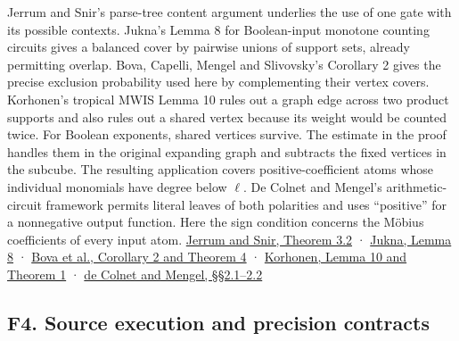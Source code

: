 \documentclass[11pt,a4paper]{article}
\begin{document}
Jerrum and Snir's parse-tree content argument underlies the use of one
gate with its possible contexts. Jukna's Lemma 8 for Boolean-input
monotone counting circuits gives a balanced cover by pairwise unions of
support sets, already permitting overlap. Bova, Capelli, Mengel and
Slivovsky's Corollary 2 gives the precise exclusion probability used
here by complementing their vertex covers. Korhonen's tropical MWIS
Lemma 10 rules out a graph edge across two product supports and also
rules out a shared vertex because its weight would be counted twice. For
Boolean exponents, shared vertices survive. The estimate in the proof
handles them in the original expanding graph and subtracts the fixed
vertices in the subcube. The resulting application covers
positive-coefficient atoms whose individual monomials have degree below
\(\ell\). De Colnet and Mengel's arithmetic-circuit framework permits
literal leaves of both polarities and uses ``positive'' for a
nonnegative output function. Here the sign condition concerns the Möbius
coefficients of every input atom.
\href{https://snir.cs.illinois.edu/listed/J7.pdf}{Jerrum and Snir,
Theorem 3.2} ·
\href{https://web.vu.lt/mif/s.jukna/ftp/counting-web.pdf}{Jukna, Lemma
8} · \href{https://arxiv.org/pdf/1411.1995}{Bova et al., Corollary 2 and
Theorem 4} ·
\href{https://doi.org/10.4230/LIPIcs.ICALP.2021.87}{Korhonen, Lemma 10
and Theorem 1} ·
\href{https://proceedings.kr.org/2021/20/kr2021-0020-de-colnet-et-al.pdf}{de
Colnet and Mengel, §§2.1--2.2}

\subsection{F4. Source execution and precision
contracts}\label{v8-f4.-source-execution-and-precision-contracts}
\end{document}
